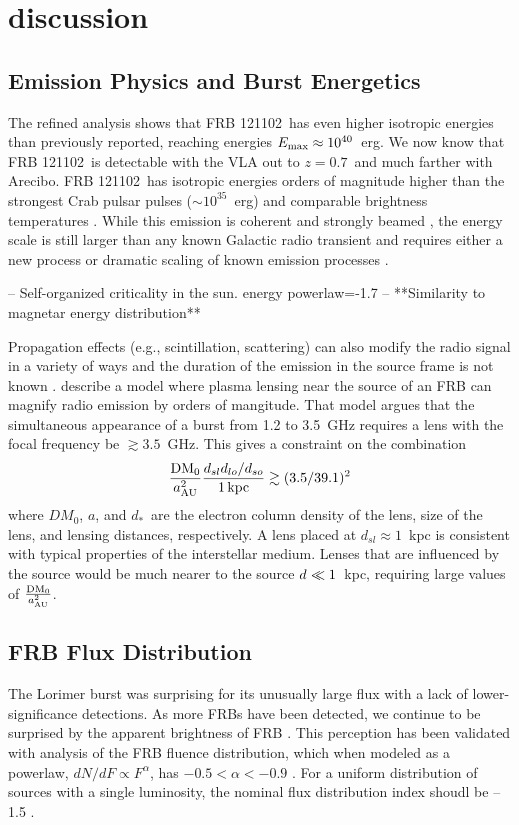 \documentclass[twocolumn]{aastex61}
\newcommand{\frb}{FRB 121102}
\begin{document}
\section{discussion}
\label{sec:disc}
\subsection{Emission Physics and Burst Energetics}
The refined analysis shows that \frb\ has even higher isotropic energies than previously reported, reaching energies $E_{\rm{max}}\approx10^{40}$\ erg. We now know that \frb\ is detectable with the VLA out to $z=0.7$\ and much farther with Arecibo. \frb\ has isotropic energies orders of magnitude higher than the strongest Crab pulsar pulses ($\sim10^{35}$~erg) and comparable brightness temperatures \citep[$T_b^{\rm{Crab}}\sim10^{41}$~K versus $T_b^{\rm{FRB 121102}}\sim10^{38}$~K;][]{2003Natur.422..141H,2014PhRvD..89j3009K}. While this emission is coherent and strongly beamed \citep{2016Natur.531..202S, WEIRD}, the energy scale is still larger than any known Galactic radio transient and requires either a new process or dramatic scaling of known emission processes \citep{2016MNRAS.462..941L, 2016MNRAS.457..232C}.

-- Self-organized criticality in the sun. energy powerlaw=-1.7 \citep{2011SoPh..274...99A}
-- **Similarity to magnetar energy distribution**

Propagation effects (e.g., scintillation, scattering) can also modify the radio signal in a variety of ways and the duration of the emission in the source frame is not known \citep{2016arXiv160505890C}. \citet{CORDES} describe a model where plasma lensing near the source of an FRB can magnify radio emission by orders of mangitude. That model argues that the simultaneous appearance of a burst from 1.2 to 3.5~GHz requires a lens with the focal frequency be $\gtrsim 3.5$~GHz. This gives a constraint on the combination 
$$\frac{\rm DM_0}{a_{\rm AU}^2} \frac{d_{sl}d_{lo}/d_{so}}{1\, \rm kpc} \gtrsim (3.5 / 39.1)^2$$
where $DM_0$, $a$, and $d_*$\ are the electron column density of the lens, size of the lens, and lensing distances, respectively. A lens placed at $d_{sl}\approx1$~kpc is consistent with typical properties of the interstellar medium. Lenses that are influenced by the source would be much nearer to the source $d_{\sl} \ll 1$~kpc, requiring large values of $\frac{\rm DM_0}{a_{\rm AU}^2}$.

\subsection{FRB Flux Distribution}
The Lorimer burst was surprising for its unusually large flux with a lack of lower-significance detections. As more FRBs have been detected, we continue to be surprised by the apparent brightness of FRB \citep{2016arXiv161105758R}. This perception has been validated with analysis of the FRB fluence distribution, which when modeled as a powerlaw, $dN/dF \propto F^{\alpha}$, has $-0.5<\alpha<-0.9$ \citep{2016ApJ...830...75V, 2016arXiv160206099L, 2016arXiv161100458L}. For a uniform distribution of sources with a single luminosity, the nominal flux distribution index shoudl be --1.5 \citep[the ``Euclidean'' distribution, e.g.,][]{2016MNRAS.462..941L}.
\end{document}
